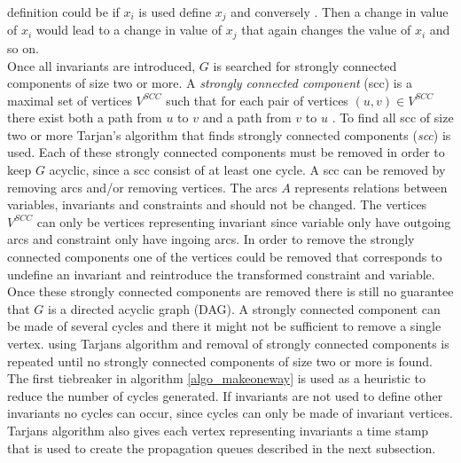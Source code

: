definition could be if $x_i$ is used define $x_j$ and conversely . Then a change in value 
of $x_i$ would lead to a change in value of $x_j$ that again changes the value of $x_i$ and so on. \\ 
Once all invariants are introduced, $G$ is searched for strongly connected components of size two or more. A 
\emph{strongly connected component} (scc) is a maximal set of vertices $V^{SCC}$ such that for each pair of vertices 
$(u,v) \in V^{SCC}$ there exist both a path from $u$ to $v$ and a path from $v$ to $u$ \cite[p. 1170]{cormen}. 
To find all scc of size two or more Tarjan's algorithm  that finds strongly connected components (\emph{scc}) is used. Each of these strongly 
connected components must be removed in order to keep $G$ acyclic, since a scc consist of at least one cycle. A scc can 
be removed  by removing arcs and/or removing vertices. The arcs $A$ represents 
relations between variables, invariants and constraints and should not be changed. The vertices $V^{SCC}$ can only be 
vertices representing invariant since variable only have outgoing arcs and constraint only have ingoing arcs. In order 
to remove the strongly connected components one of the vertices could be removed that corresponds to undefine an 
invariant and reintroduce the transformed constraint and variable. Once these strongly connected components are removed 
there is still no guarantee that $G$ is a directed acyclic graph (DAG). A strongly connected component can be made of 
several cycles and there it might not be sufficient to remove a single vertex. using Tarjans algorithm and removal of 
strongly connected components is repeated until no strongly connected components of size two or more is found. \medskip 
\\ 
The first tiebreaker in algorithm \ref{algo_makeoneway} is used as a heuristic to reduce the number of cycles 
generated. If invariants are not used to define other invariants no cycles can occur, since cycles can only be made of 
invariant vertices. \\ 
Tarjans algorithm also gives each vertex representing invariants a time stamp that is used to create the propagation 
queues described in the next subsection. \\ 



